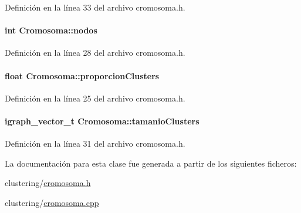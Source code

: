 Definición en la línea 33 del archivo cromosoma.\-h.

\hypertarget{class_cromosoma_a02471be3a2fd834be973bae8c2db42ac}{
\paragraph[{nodos}]{\setlength{\rightskip}{0pt plus 5cm}int Cromosoma\-::nodos\hspace{0.3cm}{\ttfamily [private]}}}\label{class_cromosoma_a02471be3a2fd834be973bae8c2db42ac}


Definición en la línea 28 del archivo cromosoma.\-h.

\hypertarget{class_cromosoma_a7e433a89f92319f7064ac2604e7eb704}{
\paragraph[{proporcion\-Clusters}]{\setlength{\rightskip}{0pt plus 5cm}float Cromosoma\-::proporcion\-Clusters\hspace{0.3cm}{\ttfamily [private]}}}\label{class_cromosoma_a7e433a89f92319f7064ac2604e7eb704}


Definición en la línea 25 del archivo cromosoma.\-h.

\hypertarget{class_cromosoma_af79cd411043a57f71a9c41b1a0f8fb9e}{
\paragraph[{tamanio\-Clusters}]{\setlength{\rightskip}{0pt plus 5cm}igraph\-\_\-vector\-\_\-t Cromosoma\-::tamanio\-Clusters\hspace{0.3cm}{\ttfamily [private]}}}\label{class_cromosoma_af79cd411043a57f71a9c41b1a0f8fb9e}


Definición en la línea 31 del archivo cromosoma.\-h.



La documentación para esta clase fue generada a partir de los siguientes ficheros\-:\begin{DoxyCompactItemize}
\item 
clustering/\hyperlink{cromosoma_8h}{cromosoma.\-h}\item 
clustering/\hyperlink{cromosoma_8cpp}{cromosoma.\-cpp}\end{DoxyCompactItemize}
